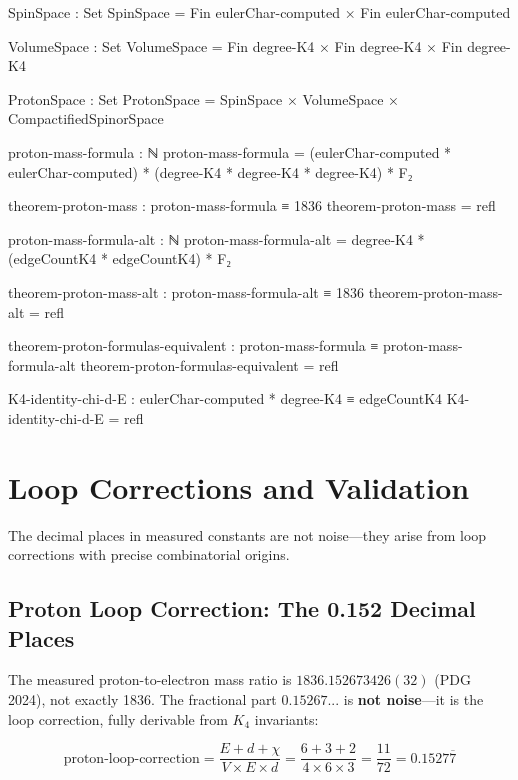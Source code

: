 \documentclass[11pt,a4paper]{book}
\begin{document}
\begin{code}
SpinSpace : Set
SpinSpace = Fin eulerChar-computed × Fin eulerChar-computed

VolumeSpace : Set
VolumeSpace = Fin degree-K4 × Fin degree-K4 × Fin degree-K4

ProtonSpace : Set
ProtonSpace = SpinSpace × VolumeSpace × CompactifiedSpinorSpace

proton-mass-formula : ℕ
proton-mass-formula = (eulerChar-computed * eulerChar-computed) * (degree-K4 * degree-K4 * degree-K4) * F₂

theorem-proton-mass : proton-mass-formula ≡ 1836
theorem-proton-mass = refl

proton-mass-formula-alt : ℕ
proton-mass-formula-alt = degree-K4 * (edgeCountK4 * edgeCountK4) * F₂

theorem-proton-mass-alt : proton-mass-formula-alt ≡ 1836
theorem-proton-mass-alt = refl

theorem-proton-formulas-equivalent : proton-mass-formula ≡ proton-mass-formula-alt
theorem-proton-formulas-equivalent = refl

K4-identity-chi-d-E : eulerChar-computed * degree-K4 ≡ edgeCountK4
K4-identity-chi-d-E = refl
\end{code}

\chapter{Loop Corrections and Validation}
\label{chap:loop-corrections}

The decimal places in measured constants are not noise---they arise from loop corrections with precise combinatorial origins.

\section{Proton Loop Correction: The 0.152 Decimal Places}

The measured proton-to-electron mass ratio is $1836.152673426(32)$ (PDG 2024), not exactly 1836.
The fractional part $0.15267...$ is \textbf{not noise}---it is the loop correction,
fully derivable from $K_4$ invariants:

\[
\text{proton-loop-correction} = \frac{E + d + \chi}{V \times E \times d} = \frac{6 + 3 + 2}{4 \times 6 \times 3} = \frac{11}{72} = 0.1527\overline{7}
\]
\end{document}
